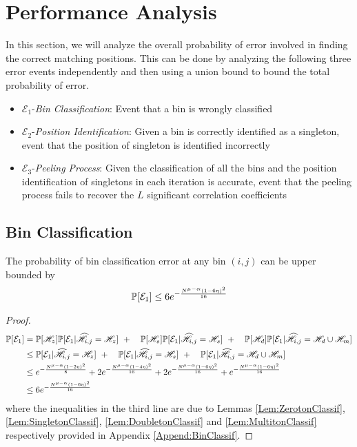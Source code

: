 \section{Performance Analysis}
\label{sec:analysis}
\def\vgap{2pt}
In this section, we will analyze the overall probability of error involved in finding the correct matching positions. This can be done by analyzing the following three error events independently and then using a union bound to bound the total probability of error.

\begin{itemize}
	\item $\mathcal{E}_1${-\it Bin Classification}: Event that a bin is wrongly classified
	\item $\mathcal{E}_2${-\it Position Identification}: Given a bin is correctly identified as a singleton, event that the position of singleton is identified incorrectly
	\item $\mathcal{E}_3${-\it Peeling Process}: Given the classification of all the bins and the position identification of singletons in each iteration is accurate, event that the peeling process fails to recover the $L$ significant correlation coefficients
\end{itemize}

\subsection{\bf Bin Classification}
\begin{lemma}
The probability of bin classification error at any bin $(i,j)$ can be upper bounded by
\begin{align*}
\mathbb{P}[\mathcal{E}_1]\leq 6e^{-\frac{N^{\mu-\alpha}(1-6\eta)^2}{16}}
\end{align*}
\end{lemma}

\begin{proof}
\begin{align*}
\mathbb{P}[\mathcal{E}_1]&=\mathbb{P}[\mathscr{H}_z]\mathbb{P}[\mathcal{E}_1|\widehat{\mathscr{H}}_{i,j}=\mathscr{H}_z]~+
						\quad \mathbb{P}[\mathscr{H}_s]\mathbb{P}[\mathcal{E}_1|\widehat{\mathscr{H}}_{i,j}=\mathscr{H}_s]~+
						\quad\mathbb{P}[\mathscr{H}_d]\mathbb{P}[\mathcal{E}_1|\widehat{\mathscr{H}}_{i,j}=\mathscr{H}_d \cup \mathscr{H}_m]\\
				&\leq \mathbb{P}[\mathcal{E}_1|\widehat{\mathscr{H}}_{i,j}=\mathscr{H}_z]~+
						\quad \mathbb{P}[\mathcal{E}_1|\widehat{\mathscr{H}}_{i,j}=\mathscr{H}_s]~+
						\quad \mathbb{P}[\mathcal{E}_1|\widehat{\mathscr{H}}_{i,j}=\mathscr{H}_d \cup \mathscr{H}_m]\\
    			&\leq  e^{-\frac{N^{\mu-\alpha}(1-2\eta)^2}{8}}+2e^{-\frac{N^{\mu-\alpha}(1-4\eta)^2}{16}}+ 2e^{-\frac{N^{\mu-\alpha}(1-6\eta)^2}{16}}+e^{-\frac{N^{\mu-\alpha}(1-6\eta)^2}{16}}\\
    			&\leq 6e^{-\frac{N^{\mu-\alpha}(1-6\eta)^2}{16}}\\
						\end{align*}
						where the inequalities in the third line are due to Lemmas \ref{Lem:ZerotonClassif}, \ref{Lem:SingletonClassif}, \ref{Lem:DoubletonClassif} and \ref{Lem:MultitonClassif} respectively provided in Appendix \ref{Append:BinClassif}.
\end{proof}

